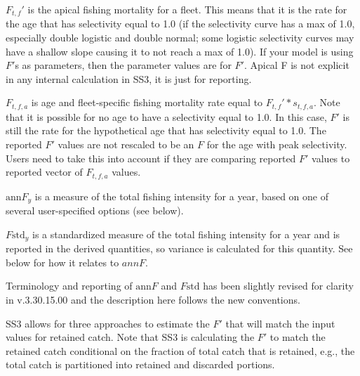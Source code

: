 $F_{t,f}'$ is the apical fishing mortality for a fleet. This means that it is the rate for the age that has selectivity equal to 1.0 (if the selectivity curve has a max of 1.0, especially double logistic and double normal; some logistic selectivity curves may have a shallow slope causing it to not reach a max of 1.0). If your model is using $F'$s as parameters, then the parameter values are for $F'$. Apical F is not explicit in any internal calculation in SS3, it is just for reporting.

$F_{t,f,a}$ is age and fleet-specific fishing mortality rate equal to $F_{t,f}' * s_{t,f,a}$. Note that it is possible for no age to have a selectivity equal to 1.0. In this case, $F'$ is still the rate for the hypothetical age that has selectivity equal to 1.0. The reported $F'$ values are not rescaled to be an $F$ for the age with peak selectivity. Users need to take this into account if they are comparing reported $F'$ values to reported vector of $F_{t,f,a}$ values.

$\text{ann}F_y$ is a measure of the total fishing intensity for a year, based on one of several user-specified options (see below).

$F\text{std}_y$ is a standardized measure of the total fishing intensity for a year and is reported in the derived quantities, so variance is calculated for this quantity. See below for how it relates to $annF$.

Terminology and reporting of $\text{ann}F$ and $F\text{std}$ has been slightly revised for clarity in v.3.30.15.00 and the description here follows the new conventions.

SS3 allows for three approaches to estimate the $F'$ that will match the input values for retained catch. Note that SS3 is calculating the $F'$ to match the retained catch conditional on the fraction of total catch that is retained, e.g., the total catch is partitioned into retained and discarded portions.

